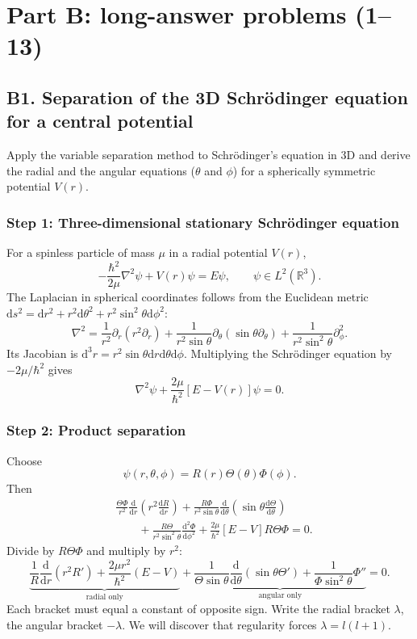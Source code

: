\documentclass[11pt,a4paper]{article}
\newcommand{\dd}{\mathrm{d}}
\newcommand{\p}{\partial}
\newcommand{\R}{\mathbb R}
\begin{document}
\clearpage
\section{Part B: long-answer problems (1--13)}
\subsection{B1. Separation of the 3D Schr\"odinger equation for a central potential}
\begin{questionbox}Apply the variable separation method to Schr\"odinger's equation in 3D and derive the radial and the angular equations (\(\theta\) and \(\phi\)) for a spherically symmetric potential \(V(r)\).\end{questionbox}
\subsubsection*{Step 1: Three-dimensional stationary Schr\"odinger equation}
For a spinless particle of mass \(\mu\) in a radial potential \(V(r)\),
\begin{equation}-\frac{\hbar^2}{2\mu}\nabla^2\psi+V(r)\psi=E\psi,\qquad \psi\in L^2(\R^3).\end{equation}
The Laplacian in spherical coordinates follows from the Euclidean metric \(\dd s^2=\dd r^2+r^2\dd\theta^2+r^2\sin^2\theta\dd\phi^2\):
\begin{equation}\boxed{\nabla^2=\frac1{r^2}\p_r(r^2\p_r)+\frac1{r^2\sin\theta}\p_\theta(\sin\theta\p_\theta)+\frac1{r^2\sin^2\theta}\p_\phi^2.}\end{equation}
Its Jacobian is \(\dd^3r=r^2\sin\theta\dd r\dd\theta\dd\phi\). Multiplying the Schr\"odinger equation by \(-2\mu/\hbar^2\) gives
\begin{equation}\nabla^2\psi+\frac{2\mu}{\hbar^2}[E-V(r)]\psi=0.\end{equation}

\subsubsection*{Step 2: Product separation}
Choose
\begin{equation}\boxed{\psi(r,\theta,\phi)=R(r)\Theta(\theta)\Phi(\phi).}\end{equation}
Then
\begin{align}
&\frac{\Theta\Phi}{r^2}\frac{\dd}{\dd r}\left(r^2\frac{\dd R}{\dd r}\right)+\frac{R\Phi}{r^2\sin\theta}\frac{\dd}{\dd\theta}\left(\sin\theta\frac{\dd\Theta}{\dd\theta}\right)\\
&\qquad+\frac{R\Theta}{r^2\sin^2\theta}\frac{\dd^2\Phi}{\dd\phi^2}+\frac{2\mu}{\hbar^2}[E-V]R\Theta\Phi=0.
\end{align}
Divide by \(R\Theta\Phi\) and multiply by \(r^2\):
\begin{equation}\underbrace{\frac1R\frac{\dd}{\dd r}(r^2R')+\frac{2\mu r^2}{\hbar^2}(E-V)}_{\text{radial only}}+\underbrace{\frac1{\Theta\sin\theta}\frac{\dd}{\dd\theta}(\sin\theta\Theta')+\frac1{\Phi\sin^2\theta}\Phi''}_{\text{angular only}}=0.\end{equation}
Each bracket must equal a constant of opposite sign. Write the radial bracket \(\lambda\), the angular bracket \(-\lambda\). We will discover that regularity forces \(\lambda=l(l+1)\).
\end{document}
